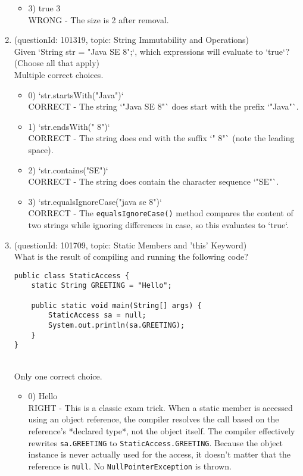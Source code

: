 \documentclass[12pt]{article}
\begin{document}
\begin{enumerate}[label=(\arabic*)]
\begin{itemize}
\item 3) true 3
 \\ 
WRONG - The size is 2 after removal.

\end{itemize}
\item (questionId: 101319, topic: String Immutability and Operations) \\ 
Given `String str = "Java SE 8";`, which expressions will evaluate to `true`? (Choose all that apply)
\\ \noindent Multiple correct choices. 
\begin{itemize}
\item 0) `str.startsWith("Java")`
 \\ 
CORRECT - The string `"Java SE 8"` does start with the prefix `"Java"`.

\item 1) `str.endsWith(" 8")`
 \\ 
CORRECT - The string does end with the suffix `" 8"` (note the leading space).

\item 2) `str.contains("SE")`
 \\ 
CORRECT - The string does contain the character sequence `"SE"`.

\item 3) `str.equalsIgnoreCase("java se 8")`
 \\ 
CORRECT - The \verb|equalsIgnoreCase()| method compares the content of two strings while ignoring differences in case, so this evaluates to `true`.

\end{itemize}
\item (questionId: 101709, topic: Static Members and 'this' Keyword) \\ 
What is the result of compiling and running the following code?\n\begin{verbatim}
public class StaticAccess {
    static String GREETING = "Hello";

    public static void main(String[] args) {
        StaticAccess sa = null;
        System.out.println(sa.GREETING);
    }
}
\end{verbatim}
\\ \noindent Only one correct choice. 
\begin{itemize}
\item 0) Hello
 \\ 
RIGHT - This is a classic exam trick. When a static member is accessed using an object reference, the compiler resolves the call based on the reference's *declared type*, not the object itself. The compiler effectively rewrites \verb|sa.GREETING| to \verb|StaticAccess.GREETING|. Because the object instance is never actually used for the access, it doesn't matter that the reference is \verb|null|. No \verb|NullPointerException| is thrown.


\end{itemize}
\end{enumerate}
\end{document}
